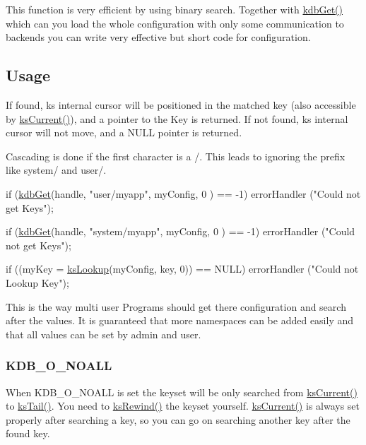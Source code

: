 This function is very efficient by using binary search. Together with \hyperlink{group__kdb_ga28e385fd9cb7ccfe0b2f1ed2f62453a1}{kdb\-Get()} which can you load the whole configuration with only some communication to backends you can write very effective but short code for configuration.\hypertarget{group__keyset_Usage}{}\subsection{Usage}\label{group__keyset_Usage}
If found, {\ttfamily ks} internal cursor will be positioned in the matched key (also accessible by \hyperlink{group__keyset_ga4287b9416912c5f2ab9c195cb74fb094}{ks\-Current()}), and a pointer to the Key is returned. If not found, {\ttfamily ks} internal cursor will not move, and a N\-U\-L\-L pointer is returned.

Cascading is done if the first character is a /. This leads to ignoring the prefix like system/ and user/. 
\begin{DoxyCode}
\textcolor{keywordflow}{if} (\hyperlink{group__kdb_ga28e385fd9cb7ccfe0b2f1ed2f62453a1}{kdbGet}(handle, \textcolor{stringliteral}{"user/myapp"}, myConfig, 0 ) == -1)
        errorHandler (\textcolor{stringliteral}{"Could not get Keys"});

\textcolor{keywordflow}{if} (\hyperlink{group__kdb_ga28e385fd9cb7ccfe0b2f1ed2f62453a1}{kdbGet}(handle, \textcolor{stringliteral}{"system/myapp"}, myConfig, 0 ) == -1)
        errorHandler (\textcolor{stringliteral}{"Could not get Keys"});

\textcolor{keywordflow}{if} ((myKey = \hyperlink{group__keyset_gaa34fc43a081e6b01e4120daa6c112004}{ksLookup}(myConfig, key, 0)) == NULL)
        errorHandler (\textcolor{stringliteral}{"Could not Lookup Key"});
\end{DoxyCode}


This is the way multi user Programs should get there configuration and search after the values. It is guaranteed that more namespaces can be added easily and that all values can be set by admin and user.\hypertarget{group__keyset_KDB_O_NOALL}{}\subsubsection{K\-D\-B\-\_\-\-O\-\_\-\-N\-O\-A\-L\-L}\label{group__keyset_KDB_O_NOALL}
When K\-D\-B\-\_\-\-O\-\_\-\-N\-O\-A\-L\-L is set the keyset will be only searched from \hyperlink{group__keyset_ga4287b9416912c5f2ab9c195cb74fb094}{ks\-Current()} to \hyperlink{group__keyset_gadca442c4ab43cf532b15091d7711559e}{ks\-Tail()}. You need to \hyperlink{group__keyset_gabe793ff51f1728e3429c84a8a9086b70}{ks\-Rewind()} the keyset yourself. \hyperlink{group__keyset_ga4287b9416912c5f2ab9c195cb74fb094}{ks\-Current()} is always set properly after searching a key, so you can go on searching another key after the found key.

